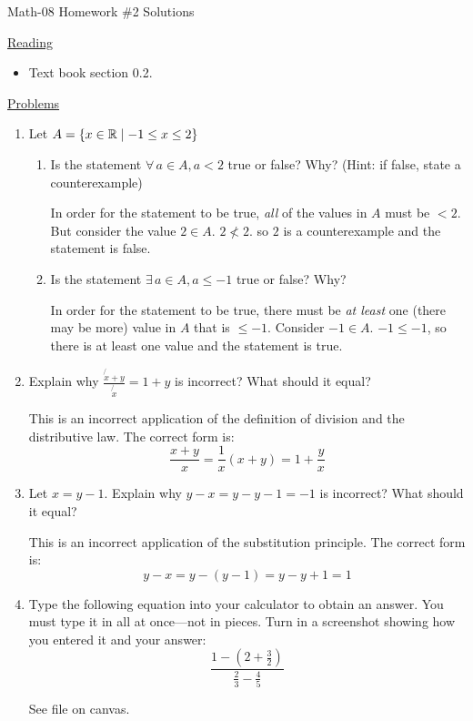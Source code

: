 \documentclass[letterpaper,12pt,fleqn]{article}
\begin{document}
\begin{center}
\Large Math-08 Homework \#2 Solutions
\end{center}

\vspace{0.5in}

\underline{Reading}

\begin{itemize}
\item Text book section 0.2.
\end{itemize}

\underline{Problems}

\begin{enumerate}
\item Let $A=\{x\in\mathbb{R}\mid-1\le x\le2\}$
  \begin{enumerate}
  \item Is the statement $\forall\,a\in A,a<2$ true or false? Why? (Hint: if
    false, state a counterexample)

    In order for the statement to be true, \emph{all} of the values in $A$
    must be $<2$. But consider the value $2\in A$. $2\not<2$. so $2$ is a
    counterexample and the statement is false.

  \item Is the statement $\exists\,a\in A,a\le-1$ true or false? Why?

    In order for the statement to be true, there must be \emph{at least} one
    (there may be more) value in $A$ that is $\le-1$. Consider $-1\in A$.
    $-1\le -1$, so there is at least one value and the statement is true.
  \end{enumerate}

\item Explain why $\frac{\not{x}+y}{\not{x}}=1+y$ is incorrect? What should it
  equal?

  This is an incorrect application of the definition of division and the
  distributive law. The correct form is:
  \[\frac{x+y}{x}=\frac{1}{x}(x+y)=1+\frac{y}{x}\]

\item Let $x=y-1$. Explain why $y-x=y-y-1=-1$ is incorrect? What should it
  equal?

  This is an incorrect application of the substitution principle. The correct
  form is:
  \[y-x=y-(y-1)=y-y+1=1\]

\item Type the following equation into your calculator to obtain an answer.
  You must type it in all at once---not in pieces. Turn in a screenshot
  showing how you entered it and your answer:
  \[\frac{1-(2+\frac{3}{2})}{\frac{2}{3}-\frac{4}{5}}\]

  See file on canvas.
\end{enumerate}
\end{document}
